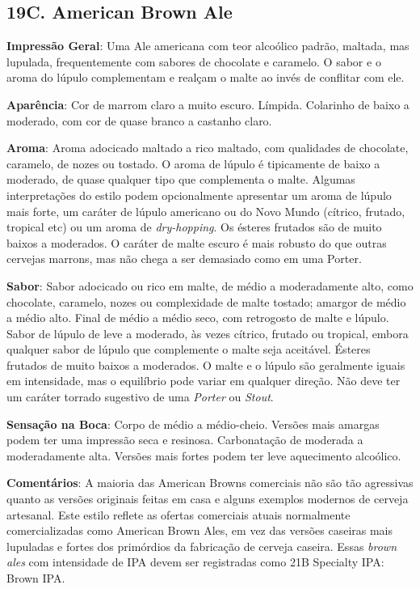 \subsection*{19C. American Brown Ale}
\textbf{Impressão Geral}: Uma Ale americana com teor alcoólico padrão, maltada, mas lupulada, frequentemente com sabores de chocolate e caramelo. O sabor e o aroma do lúpulo complementam e realçam o malte ao invés de conflitar com ele.

\textbf{Aparência}: Cor de marrom claro a muito escuro. Límpida. Colarinho de baixo a moderado, com cor de quase branco a castanho claro.

\textbf{Aroma}: Aroma adocicado maltado a rico maltado, com qualidades de chocolate, caramelo, de nozes ou tostado. O aroma de lúpulo é tipicamente de baixo a moderado, de quase qualquer tipo que complementa o malte. Algumas interpretações do estilo podem opcionalmente apresentar um aroma de lúpulo mais forte, um caráter de lúpulo americano ou do Novo Mundo (cítrico, frutado, tropical etc) ou um aroma de \textit{dry-hopping}. Os ésteres frutados são de muito baixos a moderados. O caráter de malte escuro é mais robusto do que outras cervejas marrons, mas não chega a ser demasiado como em uma Porter.

\textbf{Sabor}: Sabor adocicado ou rico em malte, de médio a moderadamente alto, como chocolate, caramelo, nozes ou complexidade de malte tostado; amargor de médio a médio alto. Final de médio a médio seco, com retrogosto de malte e lúpulo. Sabor de lúpulo de leve a moderado, às vezes cítrico, frutado ou tropical, embora qualquer sabor de lúpulo que complemente o malte seja aceitável. Ésteres frutados de muito baixos a moderados. O malte e o lúpulo são geralmente iguais em intensidade, mas o equilíbrio pode variar em qualquer direção. Não deve ter um caráter torrado sugestivo de uma \textit{Porter} ou \textit{Stout}.

\textbf{Sensação na Boca}: Corpo de médio a médio-cheio. Versões mais amargas podem ter uma impressão seca e resinosa. Carbonatação de moderada a moderadamente alta. Versões mais fortes podem ter leve aquecimento alcoólico.

\textbf{Comentários}: A maioria das American Browns comerciais não são tão agressivas quanto as versões originais feitas em casa e alguns exemplos modernos de cerveja artesanal. Este estilo reflete as ofertas comerciais atuais normalmente comercializadas como American Brown Ales, em vez das versões caseiras mais lupuladas e fortes dos primórdios da fabricação de cerveja caseira. Essas \textit{brown ales} com intensidade de IPA devem ser registradas como 21B Specialty IPA: Brown IPA.

